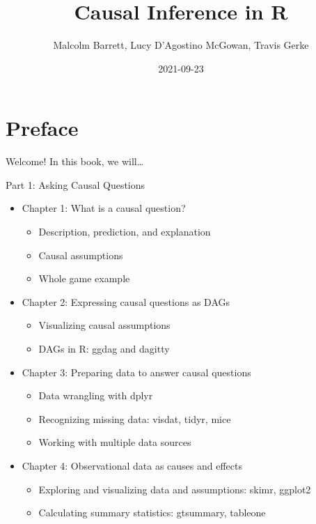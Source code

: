 \documentclass[
]{article}
\title{Causal Inference in R}
\author{Malcolm Barrett, Lucy D'Agostino McGowan, Travis Gerke}
\date{2021-09-23}
\providecommand{\tightlist}{%
  \setlength{\itemsep}{0pt}\setlength{\parskip}{0pt}}
\begin{document}
\maketitle

{
\setcounter{tocdepth}{2}
\tableofcontents
}
\hypertarget{preface}{%
\section*{Preface}\label{preface}}

Welcome! In this book, we will\ldots{}

Part 1: Asking Causal Questions

\begin{itemize}
\tightlist
\item
  Chapter 1: What is a causal question?

  \begin{itemize}
  \tightlist
  \item
    Description, prediction, and explanation\\
  \item
    Causal assumptions\\
  \item
    Whole game example
  \end{itemize}
\item
  Chapter 2: Expressing causal questions as DAGs

  \begin{itemize}
  \tightlist
  \item
    Visualizing causal assumptions\\
  \item
    DAGs in R: ggdag and dagitty
  \end{itemize}
\item
  Chapter 3: Preparing data to answer causal questions

  \begin{itemize}
  \tightlist
  \item
    Data wrangling with dplyr\\
  \item
    Recognizing missing data: visdat, tidyr, mice\\
  \item
    Working with multiple data sources
  \end{itemize}
\item
  Chapter 4: Observational data as causes and effects

  \begin{itemize}
  \tightlist
  \item
    Exploring and visualizing data and assumptions: skimr, ggplot2\\
  \item
    Calculating summary statistics: gtsummary, tableone
  \end{itemize}
\end{itemize}
\end{document}

